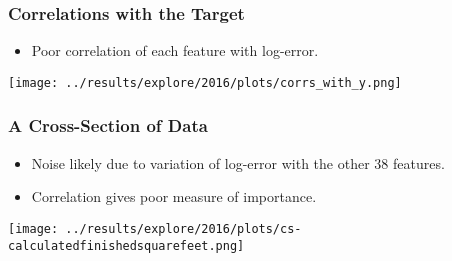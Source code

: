 \documentclass{beamer}
\begin{document}


\begin{frame}
\frametitle{Correlations with the Target}
\begin{itemize}
\item Poor correlation of each feature with log-error.
\end{itemize}
\begin{center}
\texttt{[image: ../results/explore/2016/plots/corrs\_with\_y.png]}
\end{center}
\end{frame}

\begin{frame}
\frametitle{A Cross-Section of Data}
\begin{itemize}
\item Noise likely due to variation of log-error with the other 38 features.
\item Correlation gives poor measure of importance.
\end{itemize}
\begin{center}
\texttt{[image: ../results/explore/2016/plots/cs-calculatedfinishedsquarefeet.png]}
\end{center}
\end{frame}
\end{document}
